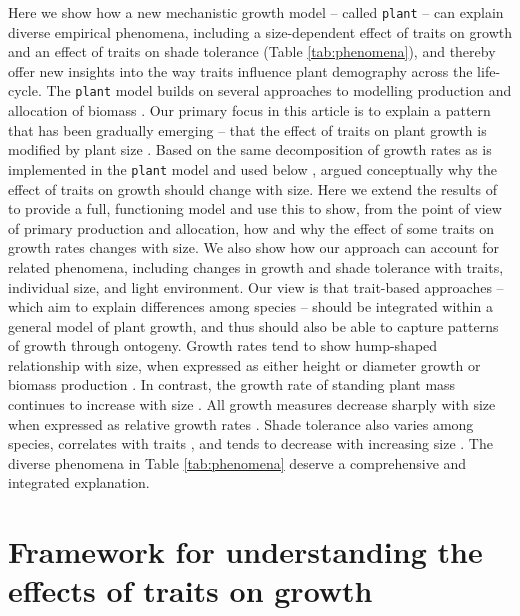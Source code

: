 \documentclass[9pt,twocolumn,twoside]{pnas-new}
\newcommand{\plant}{\texttt{plant}}
\begin{document}
Here we show how a new mechanistic growth model -- called {\plant} \citep{Falster-2016} -- can explain diverse empirical phenomena, including a size-dependent effect of traits on growth and an effect of traits on shade tolerance (Table \ref{tab:phenomena}), and thereby offer new insights into the way traits influence plant demography across the life-cycle. The {\plant} model builds on several approaches to modelling production and allocation of biomass \citep[e.g.][]{Givnish-1988, Yokozawa-1995,Makela-1997, Moorcroft-2001, Sitch-2008, Falster-2011, King-2011, Gibert-2016}. Our primary focus in this article is to explain a pattern that has been gradually emerging -- that the effect of traits on plant growth is modified by plant size \citep{Ruger-2012, Iida-2014, Gibert-2016}. Based on the same decomposition of growth rates as is implemented in the {\plant} model and used below \citep[from][]{Falster-2011}, \citep{Gibert-2016} argued conceptually why the effect of traits on growth should change with size. Here we extend the results of \citep{Gibert-2016} to provide a full, functioning model and use this to show, from the point of view of primary production and allocation, how and why the effect of some traits on growth rates changes with size. We also show how our approach can account for related phenomena, including changes in growth and shade tolerance with traits, individual size, and light environment. Our view is that trait-based approaches -- which aim to explain differences among species -- should be integrated within a general model of plant growth, and thus should also be able to capture patterns of growth through ontogeny. Growth rates tend to show hump-shaped relationship with size, when expressed as either height \citep{Sillett-2010, King-2011} or diameter growth \citep{Canham-2004, Canham-2006, Herault-2011} or biomass production \citep{Givnish-1988, Koch-2004}. In contrast, the growth rate of standing plant mass continues to increase with size \citep{Sillett-2010, Stephenson-2014}. All growth measures decrease sharply with size when expressed as relative growth rates \citep{Rees-2010, Iida-2014}. Shade tolerance also varies among species, correlates with traits \citep{Messier-1999, Lusk-2008, Poorter-2006}, and tends to decrease with increasing size \citep{Givnish-1988, Kneeshaw-2006, Lusk-2008}. The diverse phenomena in Table \ref{tab:phenomena} deserve a comprehensive and integrated explanation.

\section*{Framework for understanding the effects of traits on growth}
\end{document}

